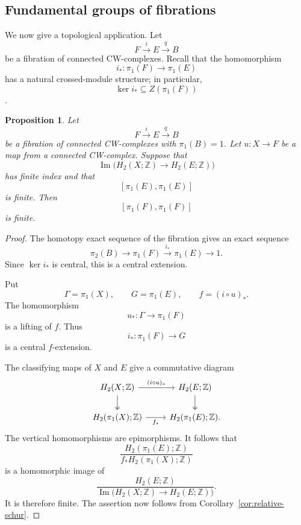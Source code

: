 \documentclass[10pt]{amsart}
\newtheorem{proposition}[theorem]{Proposition}
\renewcommand{\*}{\cdot {\dots} \cdot}
\newcommand{\?}[1]{\overset{?}{#1}}
\numberwithin{equation}{section}
\begin{document}
\subsection{Fundamental groups of fibrations}

We now give a topological application. Let
\[
F\xrightarrow{i}E\xrightarrow{q}B
\]
be a fibration of connected CW-complexes. Recall that the
homomorphism
\[
i_*\colon\pi_1(F)\longrightarrow\pi_1(E)
\]
has a natural crossed-module structure; in particular,
\[
\ker i_*\subseteq Z(\pi_1(F))
\]
\cite[Section~2.6]{BrownHigginsSivera2011}.

\begin{proposition}\label{prop:fibration-application}
Let
\[
F\xrightarrow{i}E\xrightarrow{q}B
\]
be a fibration of connected CW-complexes with
$\pi_1(B)=1$. Let $u\colon X\to F$ be a map from a connected
CW-complex. Suppose that
\[
\operatorname{Im}
\bigl(H_2(X;\mathbb Z)\longrightarrow H_2(E;\mathbb Z)\bigr)
\]
has finite index and that
\[
[\pi_1(E),\pi_1(E)]
\]
is finite. Then
\[
[\pi_1(F),\pi_1(F)]
\]
is finite.
\end{proposition}

\begin{proof}
The homotopy exact sequence of the fibration gives an exact
sequence
\[
\pi_2(B)\longrightarrow
\pi_1(F)\xrightarrow{i_*}\pi_1(E)\longrightarrow1.
\]
Since $\ker i_*$ is central, this is a central extension.

Put
\[
\Gamma=\pi_1(X),
\qquad
G=\pi_1(E),
\qquad
f=(i\circ u)_*.
\]
The homomorphism
\[
u_*\colon\Gamma\longrightarrow\pi_1(F)
\]
is a lifting of $f$. Thus
\[
i_*\colon\pi_1(F)\longrightarrow G
\]
is a central $f$-extension.

The classifying maps of $X$ and $E$ give a commutative
diagram
\[
\begin{tikzcd}
H_2(X;\mathbb Z)
    \arrow[r,"(i\circ u)_*"]
    \arrow[d,two heads]
&
H_2(E;\mathbb Z)
    \arrow[d,two heads]
\\
H_2(\pi_1(X);\mathbb Z)
    \arrow[r,"f_*"']
&
H_2(\pi_1(E);\mathbb Z).
\end{tikzcd}
\]
The vertical homomorphisms are epimorphisms. It follows that
\[
\frac{H_2(\pi_1(E);\mathbb Z)}
     {f_*H_2(\pi_1(X);\mathbb Z)}
\]
is a homomorphic image of
\[
\frac{H_2(E;\mathbb Z)}
     {\operatorname{Im}
       \bigl(H_2(X;\mathbb Z)\to H_2(E;\mathbb Z)\bigr)}.
\]
It is therefore finite. The assertion now follows from
Corollary~\ref{cor:relative-schur}.
\end{proof}
\end{document}
